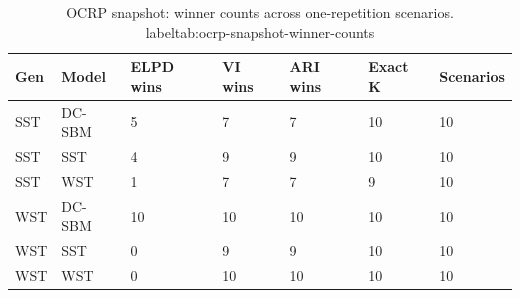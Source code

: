 \begin{table}[!h]
\centering
\caption{OCRP snapshot: winner counts across one-repetition scenarios.\\label{tab:ocrp-snapshot-winner-counts}}
\centering
\begin{tabular}[t]{lllllll}
\toprule
Gen & Model & ELPD wins & VI wins & ARI wins & Exact K & Scenarios\\
\midrule
SST & DC-SBM & 5 & 7 & 7 & 10 & 10\\
SST & SST & 4 & 9 & 9 & 10 & 10\\
SST & WST & 1 & 7 & 7 & 9 & 10\\
WST & DC-SBM & 10 & 10 & 10 & 10 & 10\\
WST & SST & 0 & 9 & 9 & 10 & 10\\
WST & WST & 0 & 10 & 10 & 10 & 10\\
\bottomrule
\end{tabular}
\end{table}

